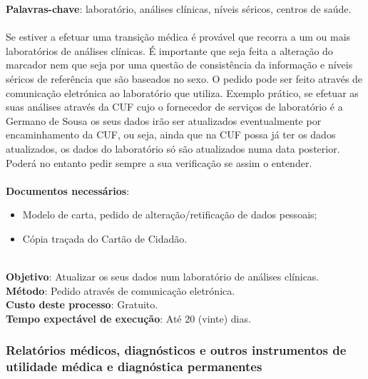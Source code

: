\textbf{Palavras-chave}: laboratório, análises clínicas, níveis séricos, centros de saúde. \\
\\
Se estiver a efetuar uma transição médica é provável que recorra a um ou
mais laboratórios de análises clínicas. É importante que seja feita a
alteração do marcador nem que seja por uma questão de consistência da
informação e níveis séricos de referência que são baseados no sexo. O
pedido pode ser feito através de comunicação eletrónica ao laboratório
que utiliza. Exemplo prático, se efetuar as suas análises através da CUF
cujo o fornecedor de serviços de laboratório é a Germano de Sousa os
seus dados irão ser atualizados eventualmente por encaminhamento da CUF,
ou seja, ainda que na CUF possa já ter os dados atualizados, os dados do
laboratório só são atualizados numa data posterior. Poderá no entanto
pedir sempre a sua verificação se assim o entender. \\
\\
\textbf{Documentos necessários}:
\begin{itemize}
	\item
	Modelo de carta, pedido de alteração/retificação de dados pessoais;
	\item
	Cópia traçada do Cartão de Cidadão.
\end{itemize}
\leavevmode\\
\textbf{Objetivo}: Atualizar os seus dados num laboratório de análises
clínicas. \\
\textbf{Método}: Pedido através de comunicação eletrónica. \\
\textbf{Custo deste processo}: Gratuito. \\
\textbf{Tempo expectável de	execução}: Até 20 (vinte) dias. \\

\subsubsection{Relatórios médicos, diagnósticos e outros instrumentos de utilidade médica e diagnóstica permanentes}

